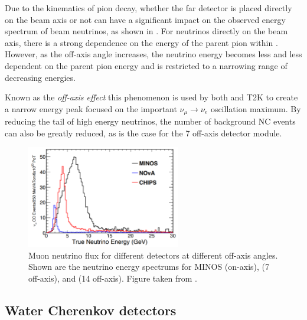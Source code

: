 Due to the kinematics of pion decay, whether the far detector is placed directly on the beam axis
or not can have a significant impact on the observed energy spectrum of beam neutrinos, as shown
in . For neutrinos directly on the beam axis, there is a strong
dependence on the energy of the parent pion within . However, as the
off-axis angle increases, the neutrino energy becomes less and less dependent on the parent pion
energy and is restricted to a narrowing range of decreasing energies. 

Known as the \emph{off-axis effect} this phenomenon is used by both \nova and T2K to create a
narrow energy peak focused on the important $\nu_{\mu}\rightarrow\nu_{e}$ oscillation maximum. By
reducing the tail of high energy neutrinos, the number of background NC events can also be greatly
reduced, as is the case for the \SI{7}{} off-axis \chipsfive detector module.

\begin{figure} %
    \includegraphics[width=0.6\textwidth]{diagrams/4-chips/numi_axis.pdf}
    \caption[Muon neutrino flux for different \numi detectors at different off-axis angles]
    {Muon neutrino flux for different \numi detectors at different off-axis angles. Shown are the
        neutrino energy spectrums for MINOS (on-axis), \chipsfive (\SI{7}{} off-axis),
        and \nova (\SI{14}{} off-axis). Figure taken from .}
    \label{fig:numi_axis}
\end{figure}

\subsection{Water Cherenkov detectors} %
\label{sec:chips_concept_cherenkov} %

